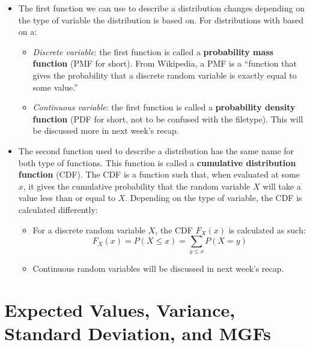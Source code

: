 \documentclass[12pt]{article}
\begin{document}
\begin{itemize}
	\item The first function we can use to describe a distribution changes depending on the type of variable the
	      distribution is based on. For distributions with based on a:

	      \begin{itemize}
		      \item \textit{Discrete variable}: the first function is called a
		            \textbf{probability mass function} (PMF for short). From Wikipedia, a
		            PMF is a ``function that gives the probability that a discrete random
		            variable is exactly equal to some value.''
		      \item \textit{Continuous variable}: the first function is called a
		            \textbf{probability density function} (PDF for short, not to be
		            confused with the filetype). This will be discussed more in
		            next week's recap.
	      \end{itemize}

	\item The second function used to describe a distribution has the same name
	      for both type of functions. This function is called a
	      \textbf{cumulative distribution function} (CDF). The CDF is a
	      function such that, when evaluated at some $x$, it gives the
	      cumulative probability that the random variable $X$ will take a value
	      less than or equal to $X$. Depending on the type of variable, the CDF
	      is calculated differently:
	      \begin{itemize}
		      \item For a discrete random variable $X$, the CDF $F_X(x)$ is calculated as such:
		            \[
			            F_X(x) = P(X \leq x) = \displaystyle\sum_{y\leq x}P(X = y)
		            \]
		      \item Continuous random variables will be discussed in next week's recap.
	      \end{itemize}
\end{itemize}

\section{Expected Values, Variance, Standard Deviation, and MGFs}
\end{document}
